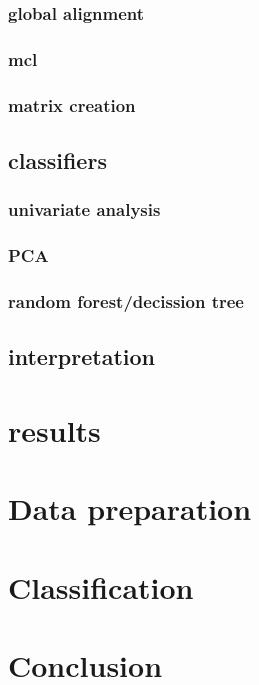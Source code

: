 \subsection{global alignment}
\subsection{mcl}
\subsection{matrix creation}
\section{classifiers}
\subsection{univariate analysis}
\subsection{PCA}
\subsection{random forest/decission tree}
\section{interpretation}

\chapter{results}
%



\chapter{Data preparation}
\chapter{Classification}
\chapter*{Conclusion}